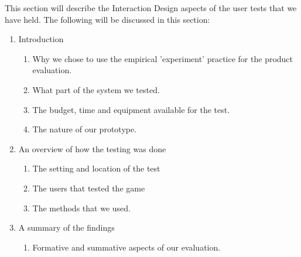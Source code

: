This section will describe the Interaction Design aspects of the user tests that we have held. The following will be discussed in this section:

\begin{enumerate}
\item Introduction
\begin{enumerate}
\item Why we chose to use the empirical 'experiment' practice for the product evaluation.
\item What part of the system we tested.
\item The budget, time and equipment available for the test.
\item The nature of our prototype.
\end{enumerate}
\item An overview of how the testing was done
\begin{enumerate}
\item The setting and location of the test
\item The users that tested the game
\item The methods that we used.
\end{enumerate}
\item A summary of the findings
\begin{enumerate}
\item Formative and summative aspects of our evaluation.
\end{enumerate}
\end{enumerate}